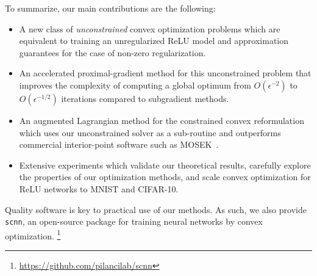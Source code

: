 To summarize, our main contributions are the following:
\begin{itemize}
    \item A new class of \emph{unconstrained} convex optimization problems
          which are equivalent to training an unregularized ReLU model and
          approximation guarantees for the case of non-zero regularization.

    \item An accelerated proximal-gradient method for this unconstrained
          problem that improves the complexity of computing a global optimum from
          \(O(\epsilon^{-2})\) to \(O(\epsilon^{-1/2})\) iterations compared to
          subgradient methods.

    \item An augmented Lagrangian method for the constrained convex
          reformulation which uses our unconstrained solver as a sub-routine and
          outperforms commercial interior-point software such as
          MOSEK~\citep{mosek}.

    \item Extensive experiments which validate our theoretical results,
          carefully explore the properties of our optimization methods, and scale
          convex optimization for ReLU networks to MNIST and CIFAR-10.
\end{itemize}

Quality software is key to practical use of our methods.
As such, we also provide \texttt{scnn}, an open-source package for training
neural networks by convex optimization.%
\footnote{\small \url{https://github.com/pilancilab/scnn}}
